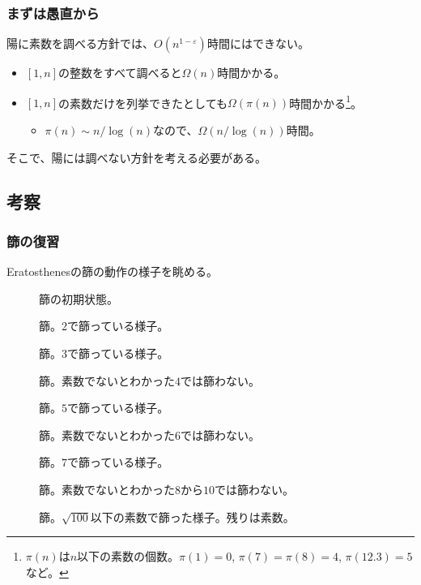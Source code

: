 \documentclass[
  lualatex,
  ja=standard,
  compress,
  hyperref={colorlinks, urlcolor=magenta, linkcolor=blue!55!black},
  dvipsnames,
  svgnames,
]{beamer}
\begin{document}
\begin{frame}
  \frametitle{まずは愚直から \theslidetopic}

  陽に素数を調べる方針では、$O(n^{1-\varepsilon})$時間にはできない。
  \begin{itemize}
  \item $[1, n]$の整数をすべて調べると$\Omega(n)$時間かかる。
  \item $[1, n]$の素数だけを列挙できたとしても$\Omega(\pi(n))$時間かかる\footnote{$\pi(n)$は$n$以下の素数の個数。$\pi(1)=0$, $\pi(7)=\pi(8)=4$, $\pi(12.3) = 5$など。}。
    \begin{itemize}
    \item $\pi(n)\sim n/\log(n)$なので、$\Omega(n/\log(n))$時間。
    \end{itemize}
  \end{itemize}

  そこで、陽には調べない方針を考える必要がある。
\end{frame}

\subsection{考察}
\begin{frame}
  \frametitle{篩の復習}
  Eratosthenesの篩の動作の様子を眺める。

  \begin{figure}
     {\caption{篩の初期状態。}}
     {\caption{篩。$2$で篩っている様子。}}
     {\caption{篩。$3$で篩っている様子。}}
     {\caption{篩。素数でないとわかった$4$では篩わない。}}
     {\caption{篩。$5$で篩っている様子。}}
     {\caption{篩。素数でないとわかった$6$では篩わない。}}
     {\caption{篩。$7$で篩っている様子。}}
     {\caption{篩。素数でないとわかった$8$から$10$では篩わない。}}
     {\caption{篩。$\sqrt{100}$以下の素数で篩った様子。残りは素数。}}
  \end{figure}
\end{frame}
\end{document}
